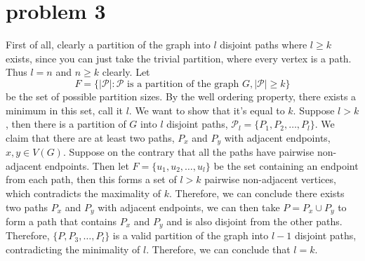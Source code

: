 \documentclass[12pt]{article}
\begin{document}
		\section{problem 3}
		First of all, clearly a partition of the graph into $l$ disjoint paths where $l \geq k$ exists, since you can just take the trivial partition, where every vertex is a path. Thus $l  = n$ and $n \geq k $ clearly. Let $$F = \{|\mathcal{P}| \colon \mathcal{P} \text{ is a partition of the graph $G$}, |\mathcal{P}| \geq k\}$$ be the set of possible partition sizes. By the well ordering property, there exists a minimum in this set, call it $l$. We want to show that it's equal to $k$. Suppose $l > k$, then there is a partition of $G$ into $l$ disjoint paths, $\mathcal{P}_l = \{P_1, P_2, \ldots, P_l\}$. We claim that there are at least two paths, $P_x$ and $P_y$ with adjacent endpoints, $x,y \in V(G)$. Suppose on the contrary that all the paths have pairwise non-adjacent endpoints. Then let $F = \{u_1,u_2,\ldots,u_l\}$ be the set containing an endpoint from each path, then this forms a set of $l > k$ pairwise non-adjacent vertices, which contradicts the maximality of $k$. Therefore, we can conclude there exists two paths $P_x$ and $P_y$ with adjacent endpoints, we can then take $P = P_x \cup P_y$ to form a path that contains $P_x$ and $P_y$ and is also disjoint from the other paths. Therefore, $\{P, P_3,\ldots,P_l\}$ is a valid partition of the graph into $l-1$ disjoint paths, contradicting the minimality of $l$. Therefore, we can conclude that $l = k$. 
\end{document}
